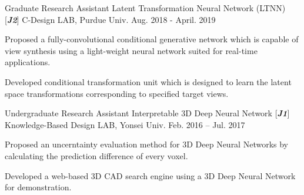 \begin{cventries}
\cventry
{Graduate Research Assistant} %
{Latent Transformation Neural Network (LTNN) [\textit{\textbf{J2}}]} %
{C-Design LAB, Purdue Univ.} %
{Aug. 2018 - April. 2019} %
{ %
\begin{cvitems}
\item {Proposed a fully-convolutional conditional generative network which is capable of view synthesis using a light-weight neural network suited for real-time applications.}
\item {Developed conditional transformation unit which is designed to learn the latent space transformations corresponding to specified target views.}
\end{cvitems}
}

\cventry
{Undergraduate Research Assistant} %
{Interpretable 3D Deep Neural Network [\textit{\textbf{J1}}]} %
{Knowledge-Based Design LAB, Yonsei Univ.} %
{Feb. 2016 – Jul. 2017} %
{ %
\begin{cvitems}
\item {Proposed an uncerntainty evaluation method for 3D Deep Neural Networks by calculating the prediction difference of every voxel.}
\item {Developed a web-based 3D CAD search engine using a 3D Deep Neural Network for demonstration.}
\end{cvitems}
}

\end{cventries}
